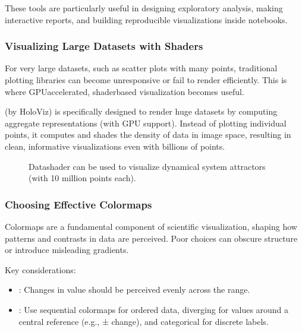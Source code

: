\documentclass[letterpaper,10pt,english]{jupyterBook}
\let\sphinxpxdimen\pdfpxdimen\else\newdimen\sphinxpxdimen
\begin{document}
\sphinxAtStartPar
These tools are particularly useful in designing exploratory analysis, making interactive reports, and building reproducible visualizations inside notebooks.


\subsubsection{Visualizing Large Datasets with Shaders}
\label{\detokenize{chapters/03/03b_visualization-tools:visualizing-large-datasets-with-shaders}}
\sphinxAtStartPar
For very large datasets, such as scatter plots with many points, traditional plotting libraries can become unresponsive or fail to render efficiently. This is where GPU\sphinxhyphen{}accelerated, shader\sphinxhyphen{}based visualization becomes useful.

\sphinxAtStartPar
{} (by HoloViz) is specifically designed to render huge datasets by computing aggregate representations (with GPU support). Instead of plotting individual points, it computes and shades the density of data in image space, resulting in clean, informative visualizations even with billions of points.

\begin{figure}[htbp]
\centering
\capstart

\noindent\sphinxincludegraphics[height=400\sphinxpxdimen]{{datashader}.jpg}
\caption{Datashader can be used to visualize dynamical system attractors (with 10 million points each).}\label{\detokenize{chapters/03/03b_visualization-tools:datashader}}\end{figure}


\subsubsection{Choosing Effective Colormaps}
\label{\detokenize{chapters/03/03b_visualization-tools:choosing-effective-colormaps}}
\sphinxAtStartPar
Colormaps are a fundamental component of scientific visualization, shaping how patterns and contrasts in data are perceived. Poor choices can obscure structure or introduce misleading gradients.

\sphinxAtStartPar
Key considerations:
\begin{itemize}
\item {} 
\sphinxAtStartPar
{}: Changes in value should be perceived evenly across the range.

\item {} 
\sphinxAtStartPar
{}: Use sequential colormaps for ordered data, diverging for values around a central reference (e.g., ± change), and categorical for discrete labels.

\end{itemize}
\end{document}
